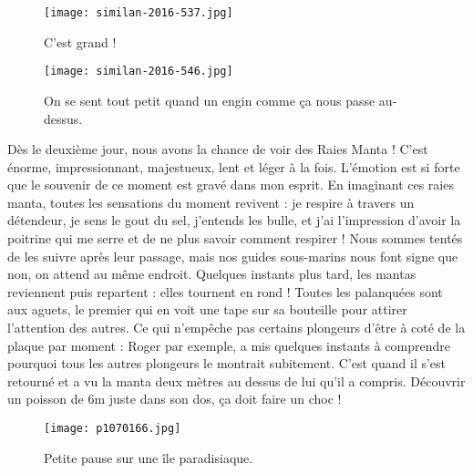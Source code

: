 \documentclass{book}
\begin{document}
\begin{figure}[h]
\centering
\texttt{[image: similan-2016-537.jpg]}
\caption*{C'est grand !}
\end{figure}


\begin{figure}[h]
\centering
\texttt{[image: similan-2016-546.jpg]}
\caption*{On se sent tout petit quand un engin comme ça nous passe au-dessus.}
\end{figure}

Dès le deuxième jour, nous avons la chance de voir des Raies Manta ! C'est énorme, impressionnant, majestueux, lent et léger à la fois. L'émotion est si forte que le souvenir de ce moment est gravé dans mon esprit. En imaginant ces raies manta, toutes les sensations du moment revivent : je respire à travers un détendeur, je sens le gout du sel, j'entends les bulle, et j'ai l'impression d'avoir la poitrine qui me serre et de ne plus savoir comment respirer ! Nous sommes tentés de les suivre après leur passage, mais nos guides sous-marins nous font signe que non, on attend au même endroit. Quelques instants plus tard, les mantas reviennent puis repartent : elles tournent en rond ! Toutes les palanquées sont aux aguets, le premier qui en voit une tape sur sa bouteille pour attirer l'attention des autres. Ce qui n'empêche pas certains plongeurs d'être à coté de la plaque par moment : Roger par exemple, a mis quelques instants à comprendre pourquoi tous les autres plongeurs le montrait subitement. C'est quand il s'est retourné et a vu la manta deux mètres au dessus de lui qu'il a compris. Découvrir un poisson de 6m juste dans son dos, ça doit faire un choc !


\begin{figure}[h]
\centering
\texttt{[image: p1070166.jpg]}
\caption*{Petite pause sur une île paradisiaque.}
\end{figure}
\end{document}
